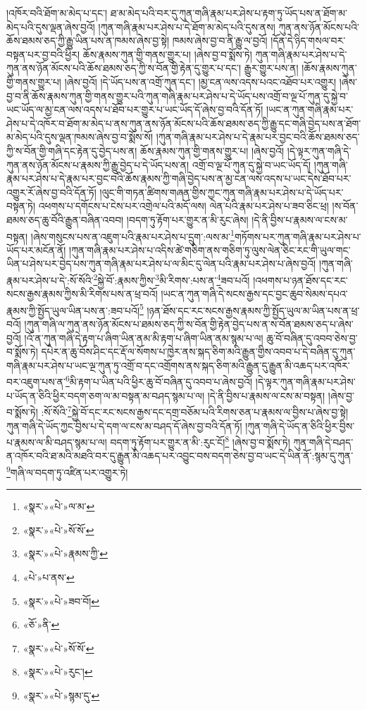 །འཁོར་བའི་ཐོག་མ་མེད་པ་དང་། ཐ་མ་མེད་པའི་བར་དུ་ཀུན་གཞི་རྣམ་པར་ཤེས་པ་རྟག་ཏུ་ཡོད་པས་ན་ཐོག་མ་མེད་པའི་དུས་ལྡན་ཞེས་བྱའོ། །ཀུན་གཞི་རྣམ་པར་ཤེས་པ་དེ་ཐོག་མ་མེད་པའི་དུས་ནས། ཀུན་ནས་ཉོན་མོངས་པའི་ཆོས་ཐམས་ཅད་ཀྱི་རྒྱུ་ཡིན་པས་ན་ཁམས་ཞེས་བྱ་སྟེ། ཁམས་ཞེས་བྱ་བ་ནི་རྒྱུ་ལ་བྱའོ། །དོན་དེ་ཉིད་གསལ་བར་བསྟན་པར་བྱ་བའི་ཕྱིར། ཆོས་རྣམས་ཀུན་གྱི་གནས་གྱུར་པ། །ཞེས་བྱ་བ་སྨོས་ཏེ། ཀུན་གཞི་རྣམ་པར་ཤེས་པ་དེ་ཀུན་ནས་ཉོན་མོངས་པའི་ཆོས་ཐམས་ཅད་ཀྱི་ས་བོན་གྱི་རྟེན་དུ་གྱུར་པ་དང་། རྒྱུར་གྱུར་པས་ན། །ཆོས་རྣམས་ཀུན་གྱི་གནས་གྱུར་པ། །ཞེས་བྱའོ། །དེ་ཡོད་པས་ན་འགྲོ་ཀུན་དང་། །མྱ་ངན་ལས་འདས་པའང་འཐོབ་པར་འགྱུར། །ཞེས་བྱ་བ་ནི་ཆོས་རྣམས་ཀུན་གྱི་གནས་གྱུར་པའི་ཀུན་གཞི་རྣམ་པར་ཤེས་པ་དེ་ཡོད་པས་འགྲོ་བ་ལྔ་པོ་ཀུན་དུ་སྐྱེ་བ་ཡང་ཡོད་ལ་མྱ་ངན་ལས་འདས་པ་ཐོབ་པར་གྱུར་པ་ཡང་ཡོད་དོ་ཞེས་བྱ་བའི་དོན་ཏོ། །ཡང་ན་ཀུན་གཞི་རྣམ་པར་ཤེས་པ་དེ་འཁོར་བ་ཐོག་མ་མེད་པ་ནས་ཀུན་ནས་ཉོན་མོངས་པའི་ཆོས་ཐམས་ཅད་ཀྱི་རྒྱུ་དང་གཞི་བྱེད་པས་ན་ཐོག་མ་མེད་པའི་དུས་ལྡན་ཁམས་ཞེས་བྱ་བ་སྨོས་སོ། །ཀུན་གཞི་རྣམ་པར་ཤེས་པ་དེ་རྣམ་པར་བྱང་བའི་ཆོས་ཐམས་ཅད་ཀྱི་ས་བོན་གྱི་གཞི་དང་རྟེན་དུ་བྱེད་པས་ན། ཆོས་རྣམས་ཀུན་གྱི་གནས་གྱུར་པ། །ཞེས་བྱའོ། །དེ་ལྟར་ཀུན་གཞི་དེ་ཀུན་ནས་ཉོན་མོངས་པ་རྣམས་ཀྱི་རྒྱུ་བྱེད་པ་དེ་ཡོད་པས་ན། འགྲོ་བ་ལྔ་པོ་ཀུན་དུ་སྐྱེ་བ་ཡང་ཡོད་དོ། །ཀུན་གཞི་རྣམ་པར་ཤེས་པ་དེ་རྣམ་པར་བྱང་བའི་ཆོས་རྣམས་ཀྱི་གཞི་བྱེད་པས་ན་མྱ་ངན་ལས་འདས་པ་ཡང་དེས་ཐོབ་པར་འགྱུར་རོ་ཞེས་བྱ་བའི་དོན་ཏོ། །ལུང་གི་གཏན་ཚིགས་གཞན་གྱིས་ཀྱང་ཀུན་གཞི་རྣམ་པར་ཤེས་པ་དེ་ཡོད་པར་བསྟན་ཏེ། འཕགས་པ་དགོངས་པ་ངེས་པར་འགྲེལ་པའི་མདོ་ལས། ལེན་པའི་རྣམ་པར་ཤེས་པ་ཟབ་ཅིང་ཕྲ། །ས་བོན་ཐམས་ཅད་ཆུ་བོའི་རྒྱུན་བཞིན་འབབ། །བདག་ཏུ་རྟོག་པར་གྱུར་ན་མི་རུང་ཞེས། །དེ་ནི་བྱིས་པ་རྣམས་ལ་ངས་མ་བསྟན། །ཞེས་གསུངས་པས་ན་འཇུག་པའི་རྣམ་པར་ཤེས་པ་དྲུག་:ལས་མ་\footnote{«སྣར་»«པེ་»ལ་མ་}གཏོགས་པར་ཀུན་གཞི་རྣམ་པར་ཤེས་པ་ཡོད་པར་མངོན་ནོ། །ཀུན་གཞི་རྣམ་པར་ཤེས་པ་འདིས་ཚེ་གཅིག་ནས་གཅིག་ཏུ་ལུས་ལེན་ཅིང་རང་གི་ཡུལ་གང་ཡིན་པ་ཤེས་པར་བྱེད་པས་ཀུན་གཞི་རྣམ་པར་ཤེས་པ་ལ་མིང་དུ་ལེན་པའི་རྣམ་པར་ཤེས་པ་ཞེས་བྱའོ། །ཀུན་གཞི་རྣམ་པར་ཤེས་པ་དེ་:སོ་སོའི་\footnote{«སྣར་»«པེ་»སོ་སོ་}སྐྱེ་བོ་:རྣམས་ཀྱིས་\footnote{«སྣར་»«པེ་»རྣམས་ཀྱི་}མི་རིགས་:པས་ན་\footnote{«པེ་»པ་ནས་}ཟབ་པའོ། །འཕགས་པ་ཉན་ཐོས་དང་རང་སངས་རྒྱས་རྣམས་ཀྱིས་མི་རིགས་པས་ན་ཕྲ་བའོ། །ཡང་ན་ཀུན་གཞི་དེ་སངས་རྒྱས་དང་བྱང་ཆུབ་སེམས་དཔའ་རྣམས་ཀྱི་སྤྱོད་ཡུལ་ཡིན་པས་ན་:ཟབ་པའོ།\footnote{«སྣར་»«པེ་»ཟབ་བོ།} །ཉན་ཐོས་དང་རང་སངས་རྒྱས་རྣམས་ཀྱི་སྤྱོད་ཡུལ་མ་ཡིན་པས་ན་ཕྲ་བའོ། །ཀུན་གཞི་ལ་ཀུན་ནས་ཉོན་མོངས་པ་ཐམས་ཅད་ཀྱི་ས་བོན་གྱི་རྟེན་བྱེད་པས་ན་ས་བོན་ཐམས་ཅད་པ་ཞེས་བྱའོ། །འོ་ན་ཀུན་གཞི་དེ་རྟག་པ་ཞིག་ཡིན་ནམ་མི་རྟག་པ་ཞིག་ཡིན་ནམ་སྙམ་པ་ལ། ཆུ་བོ་བཞིན་དུ་འབབ་ཅེས་བྱ་བ་སྨོས་ཏེ། དཔེར་ན་ཆུ་བོས་ཤིང་དང་རྡོ་ལ་སོགས་པ་ཁྱེར་ནས་སྐད་ཅིག་མའི་རྒྱུན་གྱིས་འབབ་པ་དེ་བཞིན་དུ་ཀུན་གཞི་རྣམ་པར་ཤེས་པ་ཡང་ལྔ་ཀུན་ཏུ་འགྲོ་བ་དང་འགྲོགས་ནས་སྐད་ཅིག་མའི་རྒྱུན་དུ་རྒྱུན་མི་འཆད་པར་འཁོར་བར་འཇུག་པས་ན་\footnote{«ཅོ་»ནི་}མི་རྟག་པ་ཡིན་པའི་ཕྱིར་ཆུ་བོ་བཞིན་དུ་འབབ་པ་ཞེས་བྱའོ། །དེ་ལྟར་ཀུན་གཞི་རྣམ་པར་ཤེས་པ་ཡོད་ན་ཅིའི་ཕྱིར་བདག་ཅག་ལ་མ་བསྟན་མ་བཤད་སྙམ་པ་ལ། །དེ་ནི་བྱིས་པ་རྣམས་ལ་ངས་མ་བསྟན། །ཞེས་བྱ་བ་སྨོས་ཏེ། :སོ་སོའི་\footnote{«སྣར་»«པེ་»སོ་སོ་}སྐྱེ་བོ་དང་རང་སངས་རྒྱས་དང་དགྲ་བཅོམ་པའི་རིགས་ཅན་པ་རྣམས་ལ་བྱིས་པ་ཞེས་བྱ་སྟེ། ཀུན་གཞི་དེ་ཡོད་ཀྱང་བྱིས་པ་དེ་དག་ལ་ངས་མ་བཤད་དོ་ཞེས་བྱ་བའི་དོན་ཏོ། །ཀུན་གཞི་དེ་ཡོད་ན་ཅིའི་ཕྱིར་བྱིས་པ་རྣམས་ལ་མི་བཤད་སྙམ་པ་ལ། བདག་ཏུ་རྟོག་པར་གྱུར་ན་མི་:རུང་ངོ།\footnote{«སྣར་»«པེ་»རུང་།} །ཞེས་བྱ་བ་སྨོས་ཏེ། ཀུན་གཞི་དེ་བཤད་ན་འཁོར་བའི་ཐ་མའི་མཐའི་བར་དུ་རྒྱུན་མི་འཆད་པར་འབྱུང་བས་བདག་ཅེས་བྱ་བ་ཡང་དེ་ཡིན་ནོ་:སྙམ་དུ་ཀུན་\footnote{«སྣར་»«པེ་»སྙམ་དུ་}གཞི་ལ་བདག་ཏུ་འཛིན་པར་འགྱུར་ཏེ། 